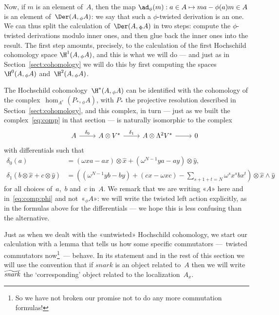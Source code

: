 Now, if $m$ is an element of~$A$, then the map $\ad_\phi(m):a\in A\mapsto
ma-\phi(a)m\in A$ is an element of~$\Der(A,{}_\phi A)$: we say that such a
$\phi$-twisted derivation is an  one. We can thus split the
calculation of~$\Der(A,{}_\Phi A)$ in two steps: compute the $\phi$-twisted
derivations modulo inner ones, and then glue back the inner ones into the
result. The first step amounts, precisely, to the calculation of the first
Hochschild cohomology space $\H^1(A,{}_\phi A)$, and this is what we will
do --- and just as in Section~\ref{sect:cohomology} we will do this by
first computing the spaces $\H^0(A,{}_\phi A)$ and~$\H^2(A,{}_\phi A)$.

\bigskip

The Hochschild cohomology~$\H^*(A,{}_\phi A)$ can be identified with the
cohomology of the complex~$\hom_{A^e}(P_*,{}_\phi A)$, with $P_*$ the
projective resolution described in Section~\ref{sect:cohomology}, and this
complex, in turn --- just as we built the complex~\eqref{eq:comp} in that
section --- is naturally isomorphic to the complex
  \[ \label{eq:comp:phi}
  \begin{tikzcd}
    & A \arrow[r, "\delta_0"]
    & A\otimes V^* \arrow[r, "\delta_1"]
    & A\otimes \Lambda^2V^* \arrow[r]
    & 0
  \end{tikzcd}
  \]
with differentials such that
  \begin{align}
  \delta_0(a) &= (\omega xa-ax)\otimes\hat x+(\omega^{N-1}ya-ay)\otimes\hat y, 
        \label{eq:d:phi:0} \\
  \delta_1(b\otimes\hat x+c\otimes\hat y) &=
    \left((\omega^{N-1}yb-by) + (cx-\omega xc) - \sum_{s+1+t=N}\omega^sx^sbx^t\right)
    \otimes\hat x\wedge\hat y
        \label{eq:d:phi:1} 
  \end{align}
for all choices of~$a$,~$b$ and~$c$ in~$A$. We remark that we are writing
«$A$» here and in~\eqref{eq:comp:phi} and not~«${}_\phi A$»: we will write
the twisted left action explicitly, as in the formulas above for the
differentials --- we hope this is less confusing than the alternative.

Just as when we dealt with the «untwisted» Hochschild cohomology, we start
our calculation with a lemma that tells us how some specific commutators
---~twisted commutators now\footnote{So we have not broken our promise not
to do any more commutation formulas!}~--- behave. In its statement and in
the rest of this section we will use the convention that if
$\mathit{snark}$ is an object related to~$A$ then we will write
$\widetilde{\smash{\mathit{snark}}}$ the `corresponding' object related to
the localization~$A_x$.


